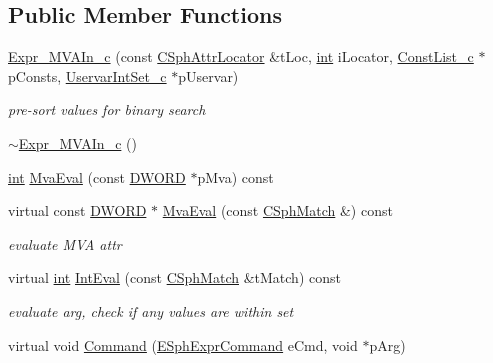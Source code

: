 \subsection*{Public Member Functions}
\begin{DoxyCompactItemize}
\item 
\hyperlink{classExpr__MVAIn__c_a12b803e3eeda0cc7c45891aeaf63f900}{Expr\-\_\-\-M\-V\-A\-In\-\_\-c} (const \hyperlink{structCSphAttrLocator}{C\-Sph\-Attr\-Locator} \&t\-Loc, \hyperlink{sphinxexpr_8cpp_a4a26e8f9cb8b736e0c4cbf4d16de985e}{int} i\-Locator, \hyperlink{classConstList__c}{Const\-List\-\_\-c} $\ast$p\-Consts, \hyperlink{classUservarIntSet__c}{Uservar\-Int\-Set\-\_\-c} $\ast$p\-Uservar)
\begin{DoxyCompactList}\small\item\em pre-\/sort values for binary search \end{DoxyCompactList}\item 
\hyperlink{classExpr__MVAIn__c_a586060458f899afed4046df8408876d3}{$\sim$\-Expr\-\_\-\-M\-V\-A\-In\-\_\-c} ()
\item 
\hyperlink{sphinxexpr_8cpp_a4a26e8f9cb8b736e0c4cbf4d16de985e}{int} \hyperlink{classExpr__MVAIn__c_a58a4990c0a315e0305d9a1a1f3a012fb}{Mva\-Eval} (const \hyperlink{sphinxstd_8h_a798af1e30bc65f319c1a246cecf59e39}{D\-W\-O\-R\-D} $\ast$p\-Mva) const 
\item 
virtual const \hyperlink{sphinxstd_8h_a798af1e30bc65f319c1a246cecf59e39}{D\-W\-O\-R\-D} $\ast$ \hyperlink{classExpr__MVAIn__c_a72d0ca4856e1eabb44c325e2f8b583d3}{Mva\-Eval} (const \hyperlink{classCSphMatch}{C\-Sph\-Match} \&) const 
\begin{DoxyCompactList}\small\item\em evaluate M\-V\-A attr \end{DoxyCompactList}\item 
virtual \hyperlink{sphinxexpr_8cpp_a4a26e8f9cb8b736e0c4cbf4d16de985e}{int} \hyperlink{classExpr__MVAIn__c_a43517d06050521359d22ccdcef9d140f}{Int\-Eval} (const \hyperlink{classCSphMatch}{C\-Sph\-Match} \&t\-Match) const 
\begin{DoxyCompactList}\small\item\em evaluate arg, check if any values are within set \end{DoxyCompactList}\item 
virtual void \hyperlink{classExpr__MVAIn__c_ae82bc7658bda27846dfdece03880f2f8}{Command} (\hyperlink{sphinxexpr_8h_a30be184fb07bd80c271360fc6094c818}{E\-Sph\-Expr\-Command} e\-Cmd, void $\ast$p\-Arg)
\item 

\end{DoxyCompactItemize}
